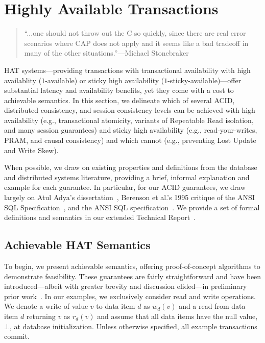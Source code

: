 
\section{Highly Available Transactions}
\label{sec:hats}

\begin{quote}
``...one should not throw out the C so quickly, since there are real
  error scenarios where CAP does not apply and it seems like a bad
  tradeoff in many of the other situations.''---Michael
  Stonebraker~\cite{stonebraker2010errors}
\end{quote}

HAT systems---providing transactions with transactional availability
with high availablity ($1$-available) or sticky high availability
($1$-sticky-available)---offer substantial latency and availability
benefits, yet they come with a cost to achievable semantics. In this
section, we delineate which of several ACID, distributed consistency,
and session consistency levels can be achieved with high availability
(e.g., transactional atomicity, variants of Repeatable Read isolation,
and many session guarantees) and sticky high availability (e.g.,
read-your-writes, PRAM, and causal consistency) and which cannot
(e.g., preventing Lost Update and Write Skew).

When possible, we draw on existing properties and definitions from the
database and distributed systems literature, providing a brief,
informal explanation and example for each guarantee. In particular,
for our ACID guarantees, we draw largely on Atul Adya's
dissertation~\cite{adya}, Berenson et al.'s 1995 critique of the ANSI
SQL Specification~\cite{ansicritique}, and the ANSI SQL
specification~\cite{ansi-sql}. We provide a set of formal definitions
and semantics in our extended Technical Report~\cite{hat-tr}.


\subsection{Achievable HAT Semantics}

To begin, we present achievable semantics, offering proof-of-concept
algorithms to demonstrate feasibility. These guarantees are fairly
straightforward and have been introduced---albeit with greater brevity
and discussion elided---in preliminary prior work~\cite{hat-hotos}. In
our examples, we exclusively consider read and write operations. We
denote a write of value $v$ to data item $d$ as $w_d(v)$ and a read
from data item $d$ returning $v$ as $r_d(v)$ and assume that all data
items have the null value, $\bot$, at database initialization. Unless
otherwise specified, all example transactions commit.

